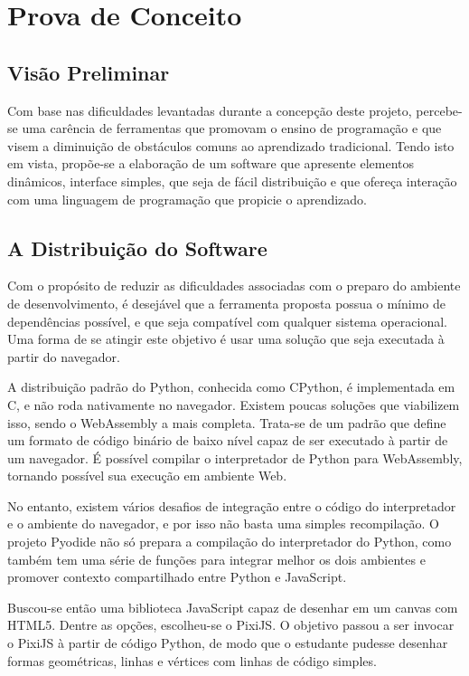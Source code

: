 \chapter[Prova de Conceito]{Prova de Conceito}

\section{Visão Preliminar}

Com base nas dificuldades levantadas durante a concepção deste projeto, percebe-se uma carência de ferramentas que promovam o ensino de programação e que visem a diminuição de obstáculos comuns ao aprendizado tradicional. Tendo isto em vista, propõe-se a elaboração de um software que apresente elementos dinâmicos, interface simples, que seja de fácil distribuição e que ofereça interação com uma linguagem de programação que propicie o aprendizado.

\section{A Distribuição do Software}

Com o propósito de reduzir as dificuldades associadas com o preparo do ambiente de desenvolvimento, é desejável que a ferramenta proposta possua o mínimo de dependências possível, e que seja compatível com qualquer sistema operacional. Uma forma de se atingir este objetivo é usar uma solução que seja executada à partir do navegador.

A distribuição padrão do Python, conhecida como CPython, é implementada em C, e não roda nativamente no navegador. Existem poucas soluções que viabilizem isso, sendo o WebAssembly a mais completa. Trata-se de um padrão que define um formato de código binário de baixo nível capaz de ser executado à partir de um navegador. É possível compilar o interpretador de Python para WebAssembly, tornando possível sua execução em ambiente Web.

No entanto, existem vários desafios de integração entre o código do interpretador e o ambiente do navegador, e por isso não basta uma simples recompilação. O projeto Pyodide não só prepara a compilação do interpretador do Python, como também tem uma série de funções para integrar melhor os dois ambientes e promover contexto compartilhado entre Python e JavaScript.

Buscou-se então uma biblioteca JavaScript capaz de desenhar em um canvas com HTML5. Dentre as opções, escolheu-se o PixiJS. O objetivo passou a ser invocar o PixiJS à partir de código Python, de modo que o estudante pudesse desenhar formas geométricas, linhas e vértices com linhas de código simples.


